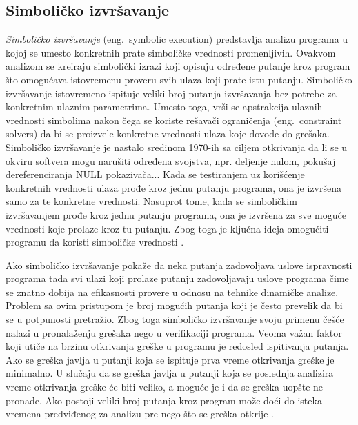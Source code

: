\documentclass[12pt,oneside]{memoir}
\begin{document}
\subsection{Simboličko izvršavanje}
\textit{Simboličko izvršavanje} (eng.~symbolic execution) predstavlja analizu programa u kojoj se umesto konkretnih prate simboličke vrednosti promenljivih. Ovakvom analizom se kreiraju simbolički izrazi koji opisuju određene putanje kroz program što omogućava istovremenu proveru svih ulaza koji prate istu putanju. Simboličko izvršavanje istovremeno ispituje veliki broj putanja izvršavanja bez potrebe za konkretnim ulaznim parametrima. Umesto toga, vrši se apstrakcija ulaznih vrednosti simbolima nakon čega se koriste rešavači ograničenja (eng.~constraint solvers) da bi se proizvele konkretne vrednosti ulaza koje dovode do grešaka. Simboličko izvršavanje je nastalo sredinom 1970-ih sa ciljem otkrivanja da li se u okviru softvera mogu narušiti određena svojstva, npr. deljenje nulom, pokušaj dereferenciranja NULL pokazivača... Kada se testiranjem uz korišćenje konkretnih vrednosti ulaza prođe kroz jednu putanju programa, ona je izvršena samo za te konkretne vrednosti. Nasuprot tome, kada se simboličkim izvršavanjem prođe kroz jednu putanju programa, ona je izvršena za sve moguće vrednosti koje prolaze kroz tu putanju. Zbog toga je ključna ideja omogućiti programu da koristi simboličke vrednosti \cite{mvj, SurveySymExec}. 

Ako simboličko izvršavanje pokaže da neka putanja zadovoljava uslove ispravnosti programa tada svi ulazi koji prolaze putanju zadovoljavaju uslove programa čime se znatno dobija na efikasnosti provere u odnosu na tehnike dinamičke analize. Problem sa ovim pristupom je broj mogućih putanja koji je često prevelik da bi se u potpunosti pretražio. Zbog toga simboličko izvršavanje svoju primenu češće nalazi  u pronalaženju grešaka nego u verifikaciji programa. Veoma važan faktor koji utiče na brzinu otkrivanja greške u programu je redosled ispitivanja putanja. Ako se greška javlja u putanji koja se ispituje prva vreme otkrivanja greške je minimalno. U slučaju da se greška javlja u putanji koja se poslednja analizira vreme otkrivanja greške će biti veliko, a moguće je i da se greška uopšte ne pronađe. Ako postoji veliki broj putanja kroz program može doći do isteka vremena predviđenog za analizu pre nego što se greška otkrije \cite{mvj}.
\end{document}
